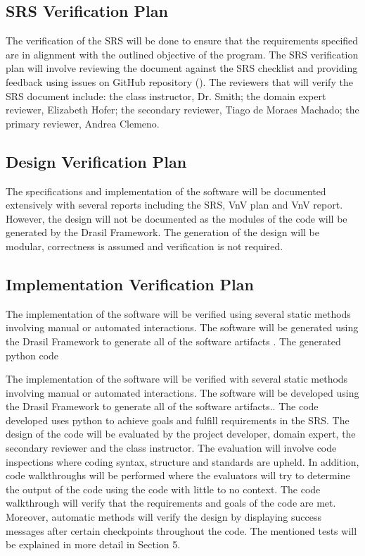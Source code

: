 \documentclass[12pt, titlepage]{article}
\begin{document}
\subsection{SRS Verification Plan}

The verification of the SRS will be done to ensure that the requirements 
specified are in alignment with the outlined objective of the \progname{} 
program. The SRS verification plan  will involve reviewing the document against 
the SRS checklist and providing feedback using issues on GitHub repository 
(\citet{SRSchecklist}). The 
reviewers that will verify the SRS document include: the class instructor, Dr. 
Smith;  the domain expert reviewer, Elizabeth Hofer; the secondary reviewer, 
Tiago de Moraes Machado; the primary reviewer, Andrea Clemeno.

\subsection{Design Verification Plan}

The specifications and implementation of the software will be documented 
extensively with several reports including the SRS, VnV plan and VnV report. 
However, the design will not be documented as the modules of the code will be 
generated by the Drasil Framework. The generation of the design will be modular, 
correctness is assumed and verification is not required.

\subsection{Implementation Verification Plan}

The implementation of the software will be verified using several static methods involving manual or automated interactions. The software will be generated using the Drasil Framework to generate all of the software artifacts \citep{Drasil}. The generated python code 


The implementation of the software will be verified with several static methods 
involving manual or automated interactions. The software will be developed using 
the Drasil Framework to generate all of the software artifacts.\citet{Drasil}. 
The code 
developed uses python to achieve goals and fulfill requirements in the SRS. The 
design of the code will be evaluated by the project developer, domain expert, 
the secondary reviewer and the class instructor. The evaluation will involve 
code inspections where coding syntax, structure and standards are upheld. In 
addition, code walkthroughs will be performed where the evaluators will try to 
determine the output of the code using the code with little to no context. The 
code walkthrough will verify that the requirements and goals of the code are 
met. Moreover, automatic methods will verify the design by displaying success 
messages after certain checkpoints throughout the code. The mentioned tests will 
be explained in more detail in Section 5.
\end{document}
